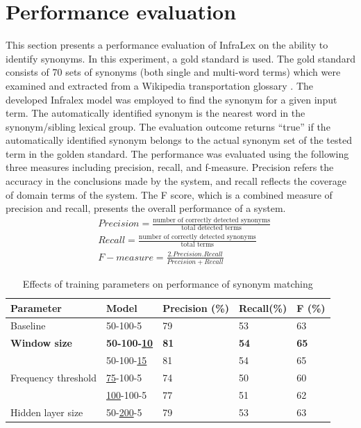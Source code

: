 \documentclass[Journal,InsideFigs, DoubleSpace]{ascelike} %
\begin{document}
\section{Performance evaluation} \label{sec:eval_infralex}
This section presents a performance evaluation of InfraLex on the ability to identify synonyms. In this experiment, a gold standard  is used. The gold standard consists of 70 sets of synonyms (both single and multi-word terms) which were examined and extracted from a Wikipedia transportation glossary \cite{wikipedia16}. The developed Infralex model was employed to find the synonym for a given input term. The automatically identified synonym is the nearest word in the synonym/sibling lexical group. The evaluation outcome returns ``true'' if the automatically identified synonym belongs to the actual synonym set of the tested term in the golden standard. The performance was evaluated using the following three measures including precision, recall, and f-measure. Precision refers the accuracy in the conclusions made by the system, and recall reflects the coverage of domain terms of the system. The F score, which is a combined measure of precision and recall, presents the overall performance of a system. 
%
\begin{align} 
&Precision = \frac{\text{number of correctly detected synonyms}}{\text{total detected terms}}  \\
&Recall = \frac{\text{number of correctly detected synonyms}}{\text{total terms}}  \\ 
&F-measure = \frac{2.Precision.Recall}{Precision+Recall}
\end{align}
\begin{table} [b] 
	\caption{Effects of training parameters on performance of synonym matching}
	\label{table:eval_syn_par_effect}
	\centering
	\small
	\renewcommand{\arraystretch}{1.25}
	\begin{tabular}{l l l l l }
		\hline
		\hline
		\textbf{Parameter} & \textbf{Model} & \textbf{Precision (\%)}  & \textbf{Recall(\%)} & \textbf{F (\%)}\\
		\hline
		Baseline	&	50-100-5	&79		&53		&63\\
		\hline
		\textbf{Window size}	&\textbf{50-100-\underline{10}}	&\textbf{81}		&\textbf{54}		&\textbf{65}\\
		&50-100-\underline{15}	&81		&54		&65\\
		\hline		
		Frequency threshold	&\underline{75}-100-5	&74		&50		&60\\
		&\underline{100}-100-5	&77		&51		&62\\
		\hline
		Hidden layer size	&50-\underline{200}-5	&79		&53		&63\\
		\hline
		\hline
	\end{tabular}
	\normalsize
\end{table}
\end{document}
